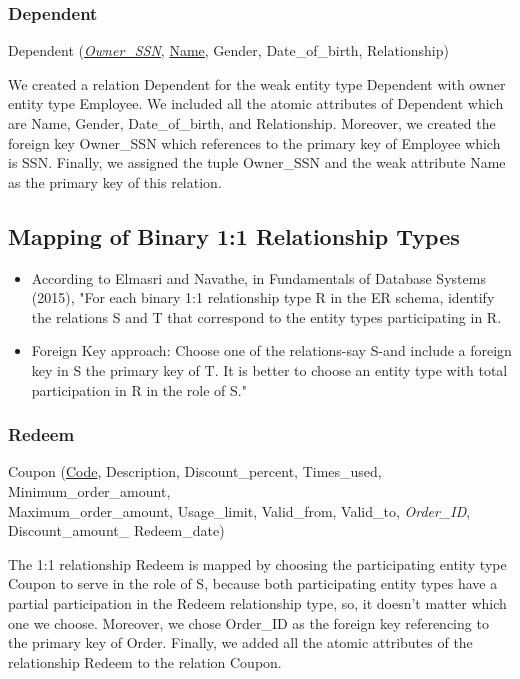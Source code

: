 \documentclass[11pt]{article}
\begin{document}
\subsubsection{Dependent}

Dependent (\underline{\textit{Owner\_SSN}}, \underline{Name}, Gender, Date\_of\_birth, Relationship)

We created a relation Dependent for the weak entity type Dependent with owner entity type Employee. We included all the atomic attributes of Dependent which are Name, Gender, Date\_of\_birth, and Relationship. Moreover, we created the foreign key Owner\_SSN which references to the primary key of Employee which is SSN. Finally, we assigned the tuple Owner\_SSN and the weak attribute Name as the primary key of this relation.

\subsection{Mapping of Binary 1:1 Relationship Types}

\begin{itemize}
  \item According to Elmasri and Navathe, in Fundamentals of Database Systems (2015), "For each binary 1:1 relationship type R in the ER schema, identify the relations S and T that correspond to the entity types participating in R.
  \item Foreign Key approach: Choose one of the relations-say S-and include a foreign key in S the primary key of T. It is better to choose an entity type with total participation in R in the role of S." \cite{elmasri}
\end{itemize}

\subsubsection{Redeem}

Coupon (\underline{Code}, Description, Discount\_percent, Times\_used, Minimum\_order\_amount, \\
Maximum\_order\_amount, Usage\_limit, Valid\_from, Valid\_to, \textit{Order\_ID}, \\
Discount\_amount\_ Redeem\_date)

The 1:1 relationship Redeem is mapped by choosing the participating entity type Coupon to serve in the role of S, because both participating entity types have a partial participation in the Redeem relationship type, so, it doesn't matter which one we choose. Moreover, we chose Order\_ID as the foreign key referencing to the primary key of Order. Finally, we added all the atomic attributes of the relationship Redeem to the relation Coupon.
\end{document}
